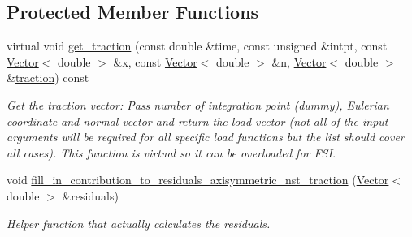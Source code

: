 \subsection*{Protected Member Functions}
\begin{DoxyCompactItemize}
\item 
virtual void \hyperlink{classoomph_1_1AxisymmetricNavierStokesTractionElement_a6cf7f8ed52ecccfad185118ffe72ebda}{get\+\_\+traction} (const double \&time, const unsigned \&intpt, const \hyperlink{classoomph_1_1Vector}{Vector}$<$ double $>$ \&x, const \hyperlink{classoomph_1_1Vector}{Vector}$<$ double $>$ \&n, \hyperlink{classoomph_1_1Vector}{Vector}$<$ double $>$ \&\hyperlink{classoomph_1_1AxisymmetricNavierStokesTractionElement_a467d411cab5179a2437fa762a0df2a02}{traction}) const
\begin{DoxyCompactList}\small\item\em Get the traction vector\+: Pass number of integration point (dummy), Eulerian coordinate and normal vector and return the load vector (not all of the input arguments will be required for all specific load functions but the list should cover all cases). This function is virtual so it can be overloaded for F\+SI. \end{DoxyCompactList}\item 
void \hyperlink{classoomph_1_1AxisymmetricNavierStokesTractionElement_abe7c7ffa2a56357512715403a9a6da26}{fill\+\_\+in\+\_\+contribution\+\_\+to\+\_\+residuals\+\_\+axisymmetric\+\_\+nst\+\_\+traction} (\hyperlink{classoomph_1_1Vector}{Vector}$<$ double $>$ \&residuals)
\begin{DoxyCompactList}\small\item\em Helper function that actually calculates the residuals. \end{DoxyCompactList}\end{DoxyCompactItemize}
